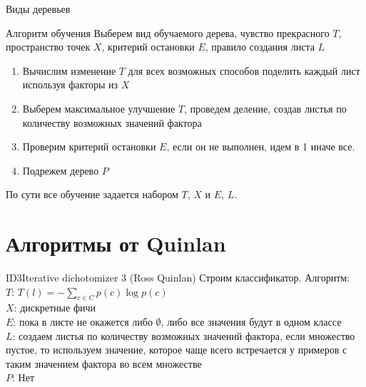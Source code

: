 \documentclass[14pt, fleqn, xcolor={dvipsnames, table}]{beamer}
\begin{document}
\begin{frame}{Виды деревьев}{}
\begin{center}
\end{center}
\end{frame}

\begin{frame}{Алгоритм обучения}
\small
Выберем вид обучаемого дерева, чувство прекрасного $T$, пространство точек $X$, критерий остановки $E$, правило создания листа $L$
\begin{enumerate}
  \item Вычислим изменение $T$ для всех возможных способов поделить каждый лист используя факторы из $X$
  \item Выберем максимальное улучшение $T$, проведем деление, создав листья по количеству возможных значений фактора
  \item Проверим критерий остановки $E$, если он не выполнен, идем в 1 иначе все.
  \item Подрежем дерево $P$
\end{enumerate}
По сути все обучение задается набором $T$, $X$ и $E$, $L$.
\end{frame}

\section{Алгоритмы от Quinlan}

\begin{frame}{ID3}{Iterative dichotomizer 3 (Ross Quinlan)}
\small
Строим классификатор. Алгоритм:\\
{\color{blue}$T$:} $T(l) = -\sum_{c\in C} p(c) \log p(c)$\\
{\color{blue}$X$:} дискретные фичи \\
{\color{blue}$E$:} пока в листе не окажется либо $\emptyset$, либо все значения будут в одном классе \\
{\color{blue}$L$:} создаем листья по количеству возможных значений фактора, если множество пустое, то используем значение, которое чаще всего встречается у примеров с таким значением фактора во всем множестве \\
{\color{blue}$P$:} Нет
\end{frame}
\end{document}
